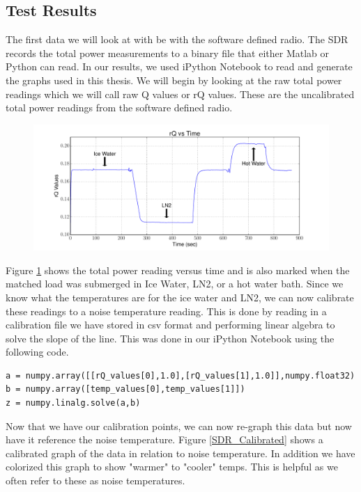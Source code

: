 \subsection{Test Results}

The first data we will look at with be with the software defined radio.  The SDR records the total power measurements to a binary file that either Matlab or Python can read.  In our results, we used iPython Notebook to read and generate the graphs used in this thesis.  We will begin by looking at the raw total power readings which we will call raw Q values or rQ values.  These are the uncalibrated total power readings from the software defined radio.  

\begin{figure}[h!tb] \centering

\includegraphics[width=\textwidth]{Experiments/Exp1/rqvstime_annotate.pdf}

\label{SDR_rQ}
\end{figure}

Figure \ref{SDR_rQ} shows the total power reading versus time and is also marked when the matched load was submerged in Ice Water, LN2, or a hot water bath.  Since we know what the temperatures are for the ice water and LN2, we can now calibrate these readings to a noise temperature reading.  This is done by reading in a calibration file we have stored in csv format and performing linear algebra to solve the slope of the line.  This was done in our iPython Notebook using the following code.
\lstset{language=Python}
\begin{lstlisting}[frame=single,keywordstyle=\color{blue}]
a = numpy.array([[rQ_values[0],1.0],[rQ_values[1],1.0]],numpy.float32)
b = numpy.array([temp_values[0],temp_values[1]])
z = numpy.linalg.solve(a,b)
\end{lstlisting}

Now that we have our calibration points, we can now re-graph this data but now have it reference the noise temperature. Figure \ref{SDR_Calibrated} shows a calibrated graph of the data in relation to noise temperature.  In addition we have colorized this graph to show "warmer" to "cooler" temps.  This is helpful as we often refer to these as noise temperatures.

